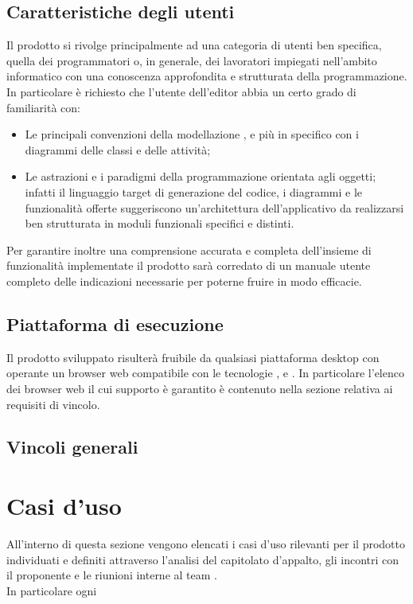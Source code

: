 	\subsection{Caratteristiche degli utenti}
	Il prodotto \proj{} si rivolge principalmente ad una categoria di utenti ben specifica, quella dei programmatori o, in generale, dei lavoratori impiegati nell'ambito informatico con una conoscenza approfondita e strutturata della programmazione.
	\\In particolare è richiesto che l'utente dell'editor abbia un certo grado di familiarità con:
		\begin{itemize}
			\item Le principali convenzioni della modellazione , e più in specifico con i diagrammi delle classi e delle attività;
			\item Le astrazioni e i paradigmi della programmazione orientata agli oggetti; infatti il linguaggio target di generazione del codice, i diagrammi e le funzionalità offerte suggeriscono un'architettura dell'applicativo da realizzarsi ben strutturata in moduli funzionali specifici e distinti.
		\end{itemize} 
	Per garantire inoltre una comprensione accurata e completa dell'insieme di funzionalità implementate il prodotto sarà corredato di un manuale utente completo delle indicazioni necessarie per poterne fruire in modo efficacie.
	\subsection{Piattaforma di esecuzione}
	Il prodotto sviluppato risulterà fruibile da qualsiasi piattaforma desktop con operante un browser web compatibile con le tecnologie ,  e . In particolare l'elenco dei browser web il cui supporto è garantito è contenuto nella sezione relativa ai requisiti di vincolo.
	\subsection{Vincoli generali}
\newpage

\section{Casi d'uso}
All'interno di questa sezione vengono elencati i casi d'uso rilevanti per il prodotto \proj{} individuati e definiti attraverso l'analisi del capitolato d'appalto, gli incontri con il proponente e le riunioni interne al team \hx{}. 
\\In particolare ogni
